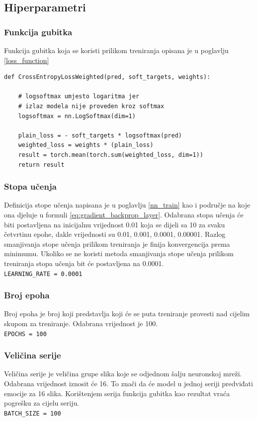 \documentclass[times, utf8, zavrsni,numeric,pstricks]{fer}
\begin{document}
\subsection{Hiperparametri}

\subsubsection{Funkcija gubitka}
Funkcija gubitka koja se koristi prilikom treniranja opisana je u poglavlju \ref{loss_function}\\
\begin{Verbatim}[fontsize=\small]
def CrossEntropyLossWeighted(pred, soft_targets, weights):        

    # logsoftmax umjesto logaritma jer
    # izlaz modela nije proveden kroz softmax
    logsoftmax = nn.LogSoftmax(dim=1)  
    
    plain_loss = - soft_targets * logsoftmax(pred)
    weighted_loss = weights * (plain_loss)
    result = torch.mean(torch.sum(weighted_loss, dim=1))
    return result
\end{Verbatim}
	
\subsubsection{Stopa učenja}
Definicija stope učenja napisana je u poglavlju \ref{nn_train} kao i područje na koje ona djeluje u formuli \ref{eq:gradient_backprop_layer}. Odabrana stopa učenja će biti postavljena na inicijalnu vrijednost 0.01 koja se dijeli sa 10 za svaku četvrtinu epohe, dakle vrijednosti su 0.01, 0.001, 0.0001, 0.00001. Razlog smanjivanja stope učenja prilikom treniranja je finija konvergencija prema minimumu. Ukoliko se ne koristi metoda smanjivanja stope učenja prilikom treniranja stopa učenja bit će postavljena na 0.0001.\\
\lstinline"LEARNING_RATE = 0.0001"

\subsubsection{Broj epoha}
Broj epoha  je broj koji predstavlja koji će se puta treniranje provesti nad cijelim skupom za treniranje. Odabrana vrijednost je 100.\\
\lstinline"EPOCHS = 100"

\subsubsection{Veličina serije}
Veličina serije  je veličina grupe slika koje se odjednom šalju neuronskoj mreži. Odabrana vrijednost iznosit će 16. To znači da će model u jednoj seriji predviđati emocije za 16 slika. Korištenjem serija funkcija gubitka kao rezultat vraća pogrešku za cijelu seriju.\\ \lstinline"BATCH_SIZE = 100"
\end{document}
